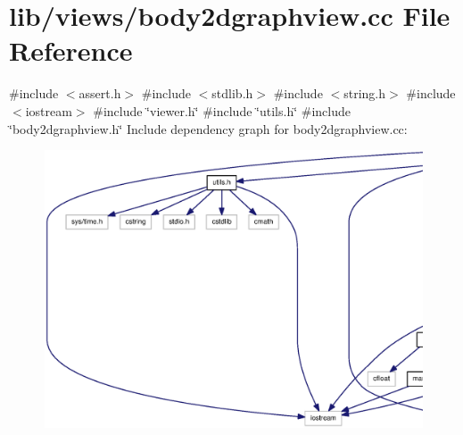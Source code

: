\section{lib/views/body2dgraphview.cc \-File \-Reference}
\label{body2dgraphview_8cc}
{\ttfamily \#include $<$assert.\-h$>$}\*
{\ttfamily \#include $<$stdlib.\-h$>$}\*
{\ttfamily \#include $<$string.\-h$>$}\*
{\ttfamily \#include $<$iostream$>$}\*
{\ttfamily \#include \char`\"{}viewer.\-h\char`\"{}}\*
{\ttfamily \#include \char`\"{}utils.\-h\char`\"{}}\*
{\ttfamily \#include \char`\"{}body2dgraphview.\-h\char`\"{}}\*
\-Include dependency graph for body2dgraphview.\-cc\-:\nopagebreak
\begin{figure}[H]
\begin{center}
\leavevmode
\includegraphics[width=350pt]{body2dgraphview_8cc__incl}
\end{center}
\end{figure}

